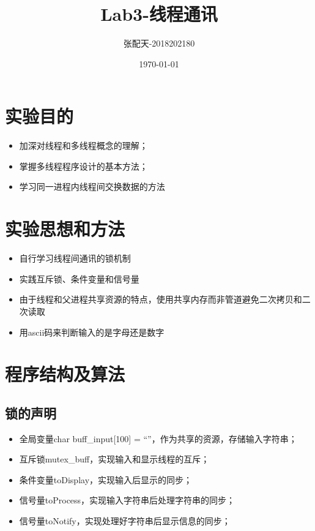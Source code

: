 \documentclass[UTF8]{ctexart}
\title{Lab3-线程通讯}
\author{张配天-2018202180}
\date{\today}
\begin{document}
    \maketitle
    \tableofcontents
    \section{实验目的}
    \begin{itemize}
        \item 加深对线程和多线程概念的理解；
        \item 掌握多线程程序设计的基本方法；
        \item 学习同一进程内线程间交换数据的方法    
    \end{itemize}

    \section{实验思想和方法}
    \begin{itemize}
        \item 自行学习线程间通讯的锁机制
        \item 实践互斥锁、条件变量和信号量
        \item 由于线程和父进程共享资源的特点，使用共享内存而非管道避免二次拷贝和二次读取
        \item 用ascii码来判断输入的是字母还是数字
    \end{itemize}
    
    \section{程序结构及算法}
    \subsection{锁的声明}
    \begin{itemize}
        \item 全局变量char buff\_input[100] = “”，作为共享的资源，存储输入字符串；
        \item 互斥锁mutex\_buff，实现输入和显示线程的互斥；
        \item 条件变量toDisplay，实现输入后显示的同步；
        \item 信号量toProcess，实现输入字符串后处理字符串的同步；
        \item 信号量toNotify，实现处理好字符串后显示信息的同步；
    \end{itemize}
\end{document}
